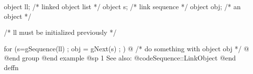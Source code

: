 object  ll;  /*  linked object list */
object  s;   /*  link sequence      */
object  obj; /*  an object          */

/*  ll must be initialized previously  */

for (s=gSequence(ll) ; obj = gNext(s) ; )  @{
        /*  do something with object obj  */
@}
@end group
@end example
@sp 1
See also:  @code{Sequence::LinkObject}
@end deffn






